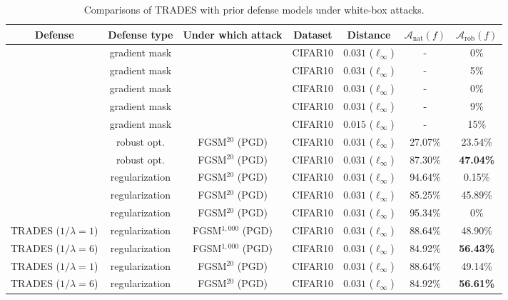 \documentclass[11pt]{article}
\newcommand{\adv}{\mathrm{rob}}
\newcommand{\nat}{\mathrm{nat}}
\newcommand{\0}{\mathbf{0}}
\newcommand{\1}{\mathbf{1}}
\newcommand{\cA}{\mathcal{A}}
\begin{document}
\begin{table*}
	\caption{Comparisons of TRADES with prior defense models under white-box attacks.}
	\label{table: icml best paper defense}
	\centering
\begin{tabular}{c||c|c|c|c|c|c}\hline
		Defense & Defense type & Under which attack & Dataset & Distance & $\cA_\nat(f)$   & $\cA_\adv(f)$  
		\\
		\hline
		\hline
		\cite{buckman2018thermometer} & gradient mask & \cite{athalye2018obfuscated} & CIFAR10 & $0.031$ ($\ell_\infty$) & - & 0\% \\
		\cite{ma2018characterizing} & gradient mask & \cite{athalye2018obfuscated} & CIFAR10 &  $0.031$ ($\ell_\infty$) & - & 5\% \\
		\cite{dhillon2018stochastic} & gradient mask & \cite{athalye2018obfuscated} & CIFAR10 &  $0.031$ ($\ell_\infty$) & - & 0\% \\
		\cite{song2018pixeldefend} & gradient mask & \cite{athalye2018obfuscated} & CIFAR10 & $0.031$ ($\ell_\infty$) & - & 9\% \\ 
		\cite{na2017cascade} & gradient mask & \cite{athalye2018obfuscated} & CIFAR10 & $0.015$ ($\ell_\infty$) & - & 15\% \\ 
		\cite{wong1805scaling} & robust opt. & FGSM$^{20}$ (PGD) & CIFAR10 & $0.031$ ($\ell_\infty$) & 27.07\% & 23.54\% \\
		\cite{madry2018towards} & robust opt. & FGSM$^{20}$ (PGD) & CIFAR10 & $0.031$ ($\ell_\infty$) & 87.30\% & \textbf{47.04\%} \\
		\cite{zheng2016improving} & regularization & FGSM$^{20}$ (PGD) & CIFAR10 & $0.031$ ($\ell_\infty$) & 94.64\% & 0.15\% \\
		\cite{kurakin2016adversarial} & regularization & FGSM$^{20}$ (PGD) & CIFAR10 & $0.031$ ($\ell_\infty$) & 85.25\% & 45.89\% \\
		\cite{ross2017improving} & regularization & FGSM$^{20}$ (PGD) & CIFAR10 & $0.031$ ($\ell_\infty$) & 95.34\% & 0\% \\
		{TRADES} ($1/\lambda=1$) & regularization & FGSM$^{1,000}$ (PGD)  & CIFAR10 &  $0.031$ ($\ell_\infty$) & 88.64\% & 48.90\% \\
		{TRADES} ($1/\lambda=6$) & regularization & FGSM$^{1,000}$ (PGD) & CIFAR10 &  $0.031$ ($\ell_\infty$) & 84.92\% & \textbf{56.43\%} \\
		{TRADES} ($1/\lambda=1$) & regularization & FGSM$^{20}$ (PGD)  & CIFAR10 &  $0.031$ ($\ell_\infty$) & 88.64\% & 49.14\% \\
		{TRADES} ($1/\lambda=6$) & regularization & FGSM$^{20}$ (PGD) & CIFAR10 &  $0.031$ ($\ell_\infty$) & 84.92\% & \textbf{56.61\%} \\

\end{tabular}
\end{table*}
\end{document}
